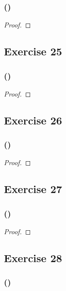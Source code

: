 \documentclass[14pt]{extarticle}
\begin{document}
\subsubsection{()}

\begin{proof}

\end{proof}

\subsection{Exercise 25}

\subsubsection{()}

\begin{proof}

\end{proof}

\subsection{Exercise 26}

\subsubsection{()}

\begin{proof}

\end{proof}

\subsection{Exercise 27}

\subsubsection{()}

\begin{proof}

\end{proof}

\subsection{Exercise 28}

\subsubsection{()}
\end{document}
